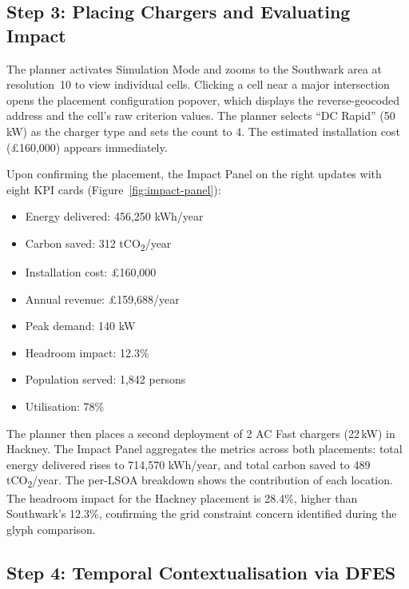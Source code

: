 \subsection{Step 3: Placing Chargers and Evaluating Impact}
\label{sec:uc-placement}

The planner activates Simulation Mode and zooms to the Southwark area at resolution~10 to view individual cells. Clicking a cell near a major intersection opens the placement configuration popover, which displays the reverse-geocoded address and the cell's raw criterion values. The planner selects ``DC Rapid'' (50\,kW) as the charger type and sets the count to 4. The estimated installation cost (\pounds160,000) appears immediately.

Upon confirming the placement, the Impact Panel on the right updates with eight KPI cards (Figure~\ref{fig:impact-panel}):

\begin{itemize}[nosep]
    \item Energy delivered: 456,250 kWh/year
    \item Carbon saved: 312 tCO\textsubscript{2}/year
    \item Installation cost: \pounds160,000
    \item Annual revenue: \pounds159,688/year
    \item Peak demand: 140 kW
    \item Headroom impact: 12.3\%
    \item Population served: 1,842 persons
    \item Utilisation: 78\%
\end{itemize}

The planner then places a second deployment of 2 AC Fast chargers (22\,kW) in Hackney. The Impact Panel aggregates the metrics across both placements: total energy delivered rises to 714,570 kWh/year, and total carbon saved to 489 tCO\textsubscript{2}/year. The per-LSOA breakdown shows the contribution of each location. The headroom impact for the Hackney placement is 28.4\%, higher than Southwark's 12.3\%, confirming the grid constraint concern identified during the glyph comparison.

\subsection{Step 4: Temporal Contextualisation via DFES}
\label{sec:uc-dfes}

